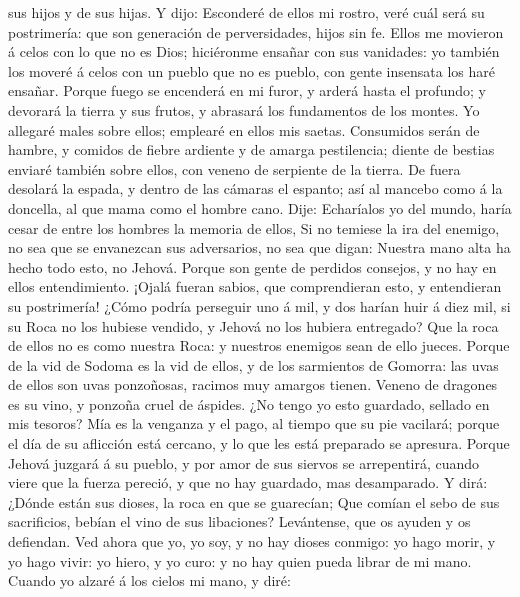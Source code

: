 sus hijos y de sus hijas.  Y dijo: Esconderé de ellos mi
rostro, veré cuál será su postrimería: que son generación de
perversidades, hijos sin fe.  Ellos me movieron á celos con
lo que no es Dios; hiciéronme ensañar con sus vanidades: yo también los
moveré á celos con un pueblo que no es pueblo, con gente insensata los
haré ensañar.  Porque fuego se encenderá en mi furor, y
arderá hasta el profundo; y devorará la tierra y sus frutos, y abrasará
los fundamentos de los montes.  Yo allegaré males sobre
ellos; emplearé en ellos mis saetas.  Consumidos serán de
hambre, y comidos de fiebre ardiente y de amarga pestilencia; diente de
bestias enviaré también sobre ellos, con veneno de serpiente de la
tierra.  De fuera desolará la espada, y dentro de las
cámaras el espanto; así al mancebo como á la doncella, al que mama como
el hombre cano.  Dije: Echaríalos yo del mundo, haría cesar
de entre los hombres la memoria de ellos,  Si no temiese la
ira del enemigo, no sea que se envanezcan sus adversarios, no sea que
digan: Nuestra mano alta ha hecho todo esto, no Jehová. 
Porque son gente de perdidos consejos, y no hay en ellos entendimiento.
 ¡Ojalá fueran sabios, que comprendieran esto, y
entendieran su postrimería!  ¿Cómo podría perseguir uno á
mil, y dos harían huir á diez mil, si su Roca no los hubiese vendido, y
Jehová no los hubiera entregado?  Que la roca de ellos no
es como nuestra Roca: y nuestros enemigos sean de ello jueces.
 Porque de la vid de Sodoma es la vid de ellos, y de los
sarmientos de Gomorra: las uvas de ellos son uvas ponzoñosas, racimos
muy amargos tienen.  Veneno de dragones es su vino, y
ponzoña cruel de áspides.  ¿No tengo yo esto guardado,
sellado en mis tesoros?  Mía es la venganza y el pago, al
tiempo que su pie vacilará; porque el día de su aflicción está cercano,
y lo que les está preparado se apresura.  Porque Jehová
juzgará á su pueblo, y por amor de sus siervos se arrepentirá, cuando
viere que la fuerza pereció, y que no hay guardado, mas desamparado.
 Y dirá: ¿Dónde están sus dioses, la roca en que se
guarecían;  Que comían el sebo de sus sacrificios, bebían
el vino de sus libaciones? Levántense, que os ayuden y os defiendan.
 Ved ahora que yo, yo soy, y no hay dioses conmigo: yo hago
morir, y yo hago vivir: yo hiero, y yo curo: y no hay quien pueda librar
de mi mano.  Cuando yo alzaré á los cielos mi mano, y diré:

